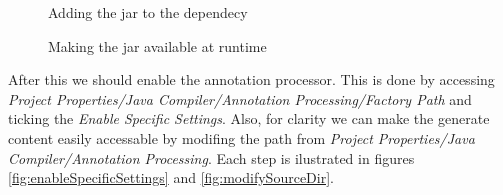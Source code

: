        \begin{figure}
             \centering
             \caption{Adding the jar to the dependecy}
             \label{fig:addJar}
        \end{figure}    

        \begin{figure}
             \centering
             \caption{Making the jar available at runtime}
             \label{fig:makeAvailable}
        \end{figure}    


        After this we should enable the annotation processor. This is done by accessing \textit{Project Properties/Java Compiler/Annotation Processing/Factory Path} and ticking the \textit{Enable Specific Settings}.
Also, for clarity we can make the generate content easily accessable by modifing the path from \textit{Project Properties/Java Compiler/Annotation Processing}. Each step is ilustrated in 
figures \ref{fig:enableSpecificSettings} and \ref{fig:modifySourceDir}.

